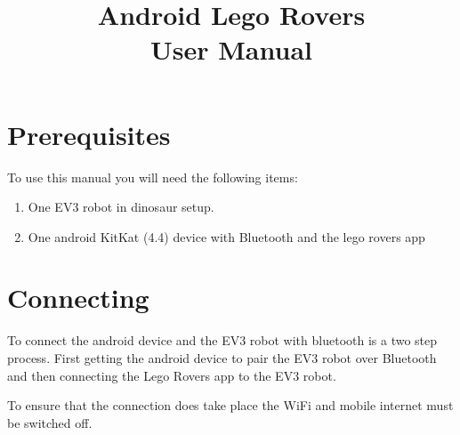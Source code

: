 \documentclass[]{article}   	%
\title{Android Lego Rovers\\User Manual}
\date{}
\begin{document}
\maketitle
\renewcommand\abstractname{}

\section{Prerequisites}
\par{To use this manual you will need the following items:
\begin{enumerate}
	\item One EV3 robot in dinosaur setup.
	\item One android KitKat (4.4) device with Bluetooth and the lego rovers app
\end{enumerate} 
}

\section{Connecting}
\par{To connect the android device and the EV3 robot with bluetooth is a two step process. First getting the android device to pair the EV3 robot over Bluetooth and then connecting the Lego Rovers app to the EV3 robot.}

\par{To ensure that the connection does take place the WiFi and mobile internet must be switched off.}

\clearpage
\end{document}
